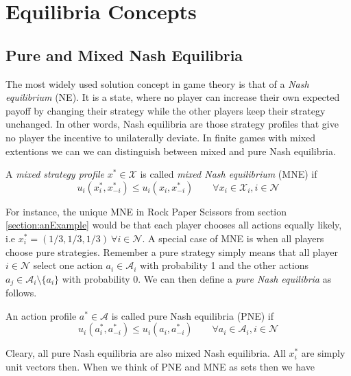 \section{Equilibria Concepts}\label{section:equilibriaConcepts}

\subsection{Pure and Mixed Nash Equilibria}\label{subsection:PNEandMNE}

The most widely used solution concept in game theory is that of a \textit{Nash equilibrium} (NE). It is a state, where no player can increase their own expected payoff by changing their strategy while the other players keep their strategy unchanged. In other words, Nash equilibria are those strategy profiles that give no player the incentive to unilaterally deviate. In finite games with mixed extentions we can we can distinguish between mixed and pure Nash equilibria. 

\begin{definition}\label{def:MNE}
A \textit{mixed strategy profile} $x^* \in \mathcal{X}$ is called \textit{mixed Nash equilibrium} (MNE) if
    \[u_i(x_{i}^{*},x_{-i}^{*}) \le  u_i(x_{i},x_{-i}^{*}) \qquad \forall x_i \in \mathcal{X}_i, i \in \mathcal{N}\]
\end{definition}

For instance, the unique MNE in Rock Paper Scissors from section \ref{section:anExample} would be that each player chooses all actions equally likely, i.e $x_{i}^{*} = (1/3,1/3,1/3) \ \forall i \in \mathcal{N}$. A special case of MNE is when all players choose pure strategies. Remember a pure strategy simply means that all player $i \in \mathcal{N}$ select one action $a_i \in \mathcal{A}_i$ with probability 1 and the other actions $a_j \in \mathcal{A}_i \setminus \{a_i\}$ with probability 0. We can then define a \textit{pure Nash equilibria} as follows.

\begin{definition}\label{def:PNE}
    An action profile $a^* \in \mathcal{A}$ is called pure Nash equilibria (PNE) if
    \[u_i(a_{i}^{*},a_{-i}^{*}) \le u_i(a_{i},a_{-i}^{*}) \qquad \forall a_i \in \mathcal{A}_i, i \in \mathcal{N}\]
\end{definition}

Cleary, all pure Nash equilibria are also mixed Nash equilibria. All $x_{i}^{*}$ are simply unit vectors then. When we think of PNE and MNE as sets then we have 

